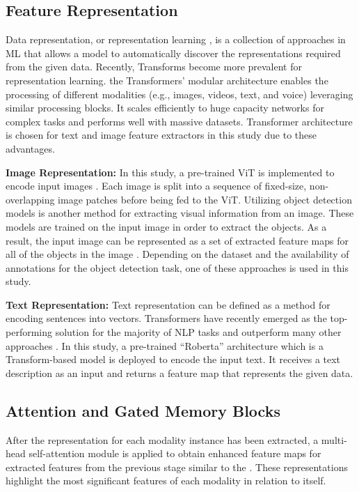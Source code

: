 \documentclass{midl}
\begin{document}
\subsection{Feature Representation}
\label{feature}
Data representation, or representation learning \cite{bengio2013representation}, is a collection of approaches in ML that allows a model to automatically discover the representations required from the given data. Recently, Transforms become more prevalent for representation learning. the Transformers' modular architecture enables the processing of different modalities (e.g., images, videos, text, and voice) leveraging similar processing blocks. It scales efficiently to huge capacity networks for complex tasks and performs well with massive datasets. Transformer architecture is chosen for text and image feature extractors in this study due to these advantages.

\textbf{Image Representation:} 
\label{image}
In this study, a pre-trained ViT \cite{dosovitskiy2020image} is implemented to encode input images . Each image is split into a sequence of fixed-size, non-overlapping image patches before being fed to the ViT.
Utilizing object detection models is another method for extracting visual information from an image. These models are trained on the input image in order to extract the objects. As a result, the input image can be represented as a set of extracted feature maps for all of the objects in the image \cite{lee2018stacked,chen2020imram}.
Depending on the dataset and the availability of annotations for the object detection task, one of these approaches is used in this study.

\textbf{Text Representation:}
Text representation can be defined as a method for encoding sentences into vectors. Transformers have recently emerged as the top-performing solution for the majority of NLP tasks and outperform many other approaches \cite{liu2019roberta,radford2019language, UsingDee40:online}.
In this study, a pre-trained ``Roberta'' architecture  \cite{liu2019roberta} which is a Transform-based model is deployed to encode the input text. It receives a text description as an input and returns a feature map that represents the given data. 

\subsection{Attention and Gated Memory Blocks}\label{memory_sec}
After the representation for each modality instance has been extracted, a multi-head self-attention module is applied to obtain  enhanced feature maps for extracted features from the previous stage similar to the \cite{wei2020multi}. These  representations highlight the most significant features of each modality in relation to itself. 
\end{document}

